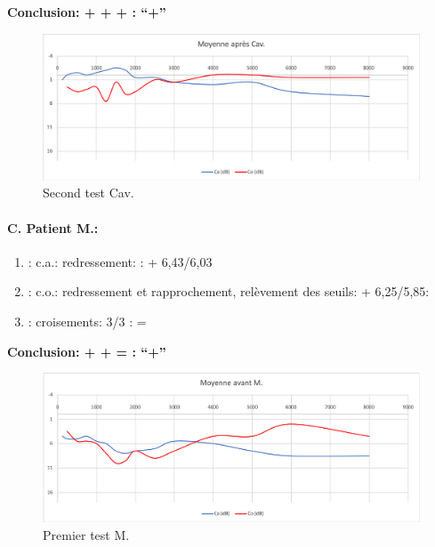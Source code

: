                 \textbf{  Conclusion:  + + +       : ``+''}

                \begin{figure}
\centering
\includegraphics[width=0.7\linewidth]{images/graphiques/cav_post.png}
\caption[Moyenne OG+OD]{Second test Cav.}
       
\label{groupecontroleimage1}
                \end{figure}



                
               \paragraph{ C. Patient M.:}


	\begin{enumerate}
 		
 		\item : c.a.: redressement: : +    6,43/6,03
                
 		\item : c.o.: redressement et rapprochement,
                  relèvement des seuils:  +     6,25/5,85:
 		\item : croisements: 3/3 :  =
                  
                \end{enumerate}

                \textbf{  Conclusion:  +  +  =     : ``+''}

                \begin{figure}
\centering
\includegraphics[width=0.7\linewidth]{images/graphiques/m_pre.png}
\caption[Moyenne OG+OD]{Premier test M.}
       
\label{groupecontroleimage1}
\end{figure}



